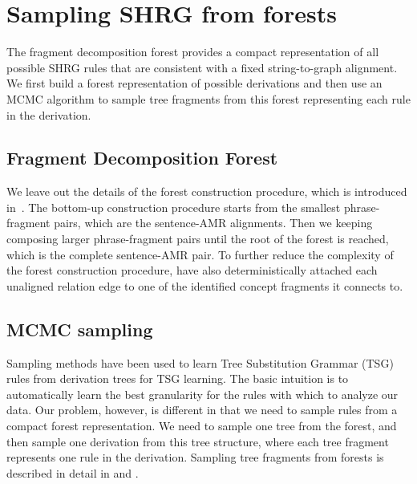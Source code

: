 \section{Sampling SHRG from forests}
The fragment decomposition forest provides a compact representation of all possible SHRG rules that are consistent with a fixed string-to-graph 
alignment. 
We first build a forest representation of possible derivations and then use an MCMC algorithm to
sample tree fragments from this forest representing each rule in the derivation.

\subsection{Fragment Decomposition Forest}
We leave out the details of the forest construction procedure, which is introduced in~. The bottom-up construction procedure starts from the 
smallest phrase-fragment pairs, which are the sentence-AMR alignments.
Then we keeping composing larger phrase-fragment pairs until the root of the forest is reached, which is the complete sentence-AMR pair.
To further reduce the complexity of the forest construction procedure,  have also deterministically attached each unaligned relation edge to one of the identified concept 
fragments it connects to.
\subsection{MCMC sampling}
Sampling methods have been used to learn Tree Substitution Grammar (TSG) rules from derivation trees \cite{cohn-2009-inducing,PostGildea-acl09} for TSG learning. 
The basic intuition is to automatically learn the best granularity for the rules
with which to analyze our data. Our problem, however, is different in that we need to
sample rules from a compact forest representation. We need to sample one tree from the forest, and then
sample one derivation from this tree structure, where each tree fragment represents one rule in the derivation. Sampling tree fragments from forests is described in detail in  and .



